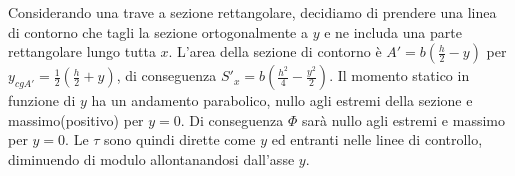 Considerando una trave a sezione rettangolare, decidiamo di prendere una linea di contorno che tagli la sezione ortogonalmente a $y$ e ne includa una parte rettangolare lungo tutta $x$. L'area della sezione di contorno è $A' = b\left( \frac{h}{2}-y\right)$ per $y_{cgA'} = \frac{1}{2}\left( \frac{h}{2}+y\right)$, di conseguenza  $S'_x = b\left( \frac{h^2}{4} - \frac{y^2}{2}\right)  $. Il momento statico in funzione di $y$ ha un andamento parabolico, nullo agli estremi della sezione e massimo(positivo) per $y=0$. Di conseguenza $\Phi$ sarà nullo agli estremi e massimo per $y=0$. Le $\tau$ sono quindi dirette come $y$ ed entranti nelle linee di controllo, diminuendo di modulo allontanandosi dall'asse $y$.














